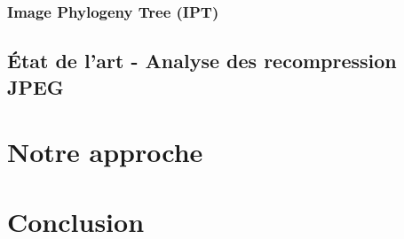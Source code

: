 \documentclass[utf8]{stageM2R} %
\begin{document}
\subsection{Image Phylogeny Tree (IPT)}

\section{État de l'art - Analyse des recompression JPEG}

\chapter{Notre approche}

\chapter*{Conclusion}

\printbibliography
\end{document}
